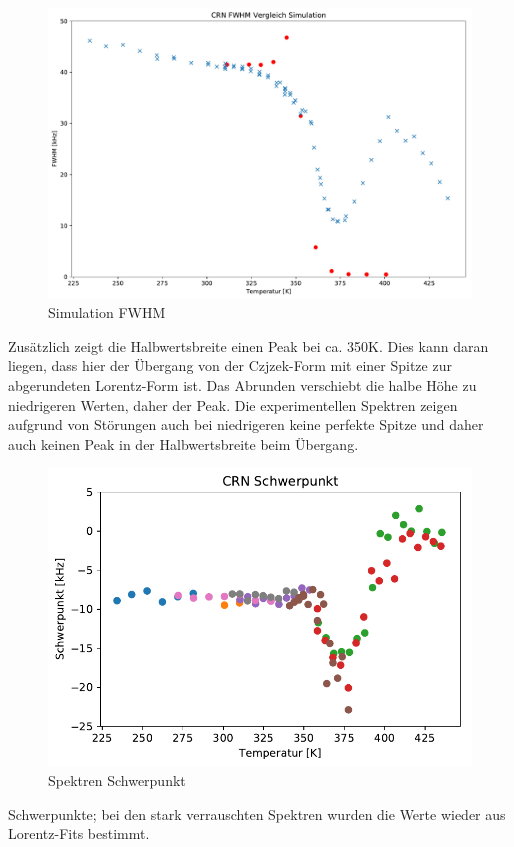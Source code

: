 \begin{figure}
	\begin{center}
		\includegraphics[width=\textwidth]{graphics/plots/SIM/sim_fwhm.pdf}
	\end{center}
	\caption{Simulation FWHM} \label{fig:res:sim_fwhm}
\end{figure}
Zusätzlich zeigt die Halbwertsbreite einen Peak bei ca. 350K. Dies kann daran liegen, dass hier der Übergang von der Czjzek-Form mit einer Spitze zur abgerundeten Lorentz-Form ist. Das Abrunden verschiebt die halbe Höhe zu niedrigeren Werten, daher der Peak. Die experimentellen Spektren zeigen aufgrund von Störungen auch bei niedrigeren keine perfekte Spitze und daher auch keinen Peak in der Halbwertsbreite beim Übergang.




\begin{figure}
	\begin{center}
		\includegraphics[width=\textwidth]{graphics/plots/SPEK/spek_mean.pdf} 
	\end{center}
	\caption{Spektren Schwerpunkt} \label{fig:res:spek_mean}
\end{figure}
Schwerpunkte; bei den stark verrauschten Spektren wurden die Werte wieder aus Lorentz-Fits bestimmt.

